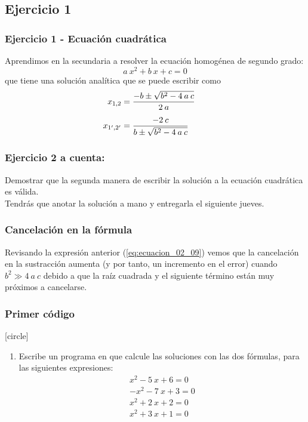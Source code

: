 \subsection{Ejercicio 1}
\begin{frame}
\frametitle{Ejercicio 1 - Ecuación cuadrática}
Aprendimos en la secundaria a resolver la ecuación homogénea de segundo grado:
\begin{equation}
a \: x^{2} + b \: x + c = 0
\label{eq:ecuacion_02_08}
\end{equation}
que tiene una solución analítica que se puede escribir como
\begin{align}
\begin{aligned}
x_{1, 2} &= \dfrac{-b \pm \sqrt{b^{2} - 4 \: a \: c}}{2 \: a} \hspace{0.5cm} \\[0.5em]
x_{1^{\prime}, 2^{\prime}} &= \dfrac{-2 \: c}{b \pm \sqrt{b^{2} - 4 \: a \: c}}
\end{aligned}
\label{eq:ecuacion_02_09}
\end{align}
\end{frame}
\begin{frame}
\frametitle{Ejercicio 2 a cuenta:}
Demostrar que la segunda manera de escribir la solución a la ecuación cuadrática es válida.
\\
\bigskip
Tendrás que anotar la solución a mano y entregarla el siguiente jueves.
\end{frame}
\begin{frame}
\frametitle{Cancelación en la fórmula}
Revisando la expresión anterior (\ref{eq:ecuacion_02_09}) vemos que la cancelación en la sustracción aumenta (y por tanto, un incremento en el error) cuando $b^{2} \gg 4 \: a \: c$ debido a que la raíz cuadrada y el siguiente término están muy próximos a cancelarse.
\end{frame}
\begin{frame}
\frametitle{Primer código}
[circle]
\begin{enumerate}
\item Escribe un programa en \python{} que calcule las soluciones con  las dos fórmulas, para las siguientes expresiones:
\begin{align*}
x^{2} - 5 \: x + 6 = 0 \\
- x^{2} - 7 \: x + 3 = 0 \\
x^{2} + 2 \: x + 2 = 0 \\
x^{2} + 3 \: x + 1 = 0
\end{align*}
\seti
\end{enumerate}
\end{frame}
